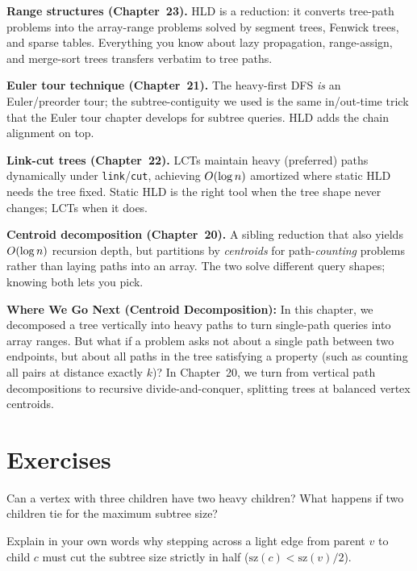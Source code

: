 \begin{connectionbox}
\textbf{Range structures (Chapter~23).} HLD is a reduction: it converts tree-path problems into the
array-range problems solved by segment trees, Fenwick trees, and sparse tables. Everything you know
about lazy propagation, range-assign, and merge-sort trees transfers verbatim to tree paths.

\textbf{Euler tour technique (Chapter~21).} The heavy-first DFS \emph{is} an Euler/preorder tour; the
subtree-contiguity we used is the same in/out-time trick that the Euler tour chapter develops for
subtree queries. HLD adds the chain alignment on top.

\textbf{Link-cut trees (Chapter~22).} LCTs maintain heavy (preferred) paths dynamically under
\texttt{link}/\texttt{cut}, achieving $O(\log n)$ amortized where static HLD needs the tree fixed.
Static HLD is the right tool when the tree shape never changes; LCTs when it does.

\textbf{Centroid decomposition (Chapter~20).} A sibling reduction that also yields $O(\log n)$
recursion depth, but partitions by \emph{centroids} for path-\emph{counting} problems rather than
laying paths into an array. The two solve different query shapes; knowing both lets you pick.

\textbf{Where We Go Next (Centroid Decomposition):} In this chapter, we decomposed a tree vertically into heavy paths to turn single-path queries into array ranges. But what if a problem asks not about a single path between two endpoints, but about all paths in the tree satisfying a property (such as counting all pairs at distance exactly $k$)? In Chapter~20, we turn from vertical path decompositions to recursive divide-and-conquer, splitting trees at balanced vertex centroids.
\end{connectionbox}

\section{Exercises}
\label{ch19:exercises}

\begin{exercise}
Can a vertex with three children have two heavy children? What happens if two children tie for the maximum subtree size?
\end{exercise}

\begin{exercise}
Explain in your own words why stepping across a light edge from parent $v$ to child $c$ must cut the subtree size strictly in half ($\mathrm{sz}(c) < \mathrm{sz}(v)/2$).
\end{exercise}

